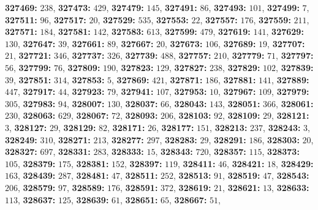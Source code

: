 \textsf{\bfseries 327469:} $238$, \textsf{\bfseries 327473:} $429$, \textsf{\bfseries 327479:} $145$, \textsf{\bfseries 327491:} $86$, \textsf{\bfseries 327493:} $101$, \textsf{\bfseries 327499:} $7$, \textsf{\bfseries 327511:} $96$, \textsf{\bfseries 327517:} $20$, \textsf{\bfseries 327529:} $535$, \textsf{\bfseries 327553:} $22$, \textsf{\bfseries 327557:} $176$, \textsf{\bfseries 327559:} $211$, \textsf{\bfseries 327571:} $184$, \textsf{\bfseries 327581:} $142$, \textsf{\bfseries 327583:} $613$, \textsf{\bfseries 327599:} $479$, \textsf{\bfseries 327619:} $141$, \textsf{\bfseries 327629:} $130$, \textsf{\bfseries 327647:} $39$, \textsf{\bfseries 327661:} $89$, \textsf{\bfseries 327667:} $20$, \textsf{\bfseries 327673:} $106$, \textsf{\bfseries 327689:} $19$, \textsf{\bfseries 327707:} $21$, \textsf{\bfseries 327721:} $346$, \textsf{\bfseries 327737:} $326$, \textsf{\bfseries 327739:} $488$, \textsf{\bfseries 327757:} $210$, \textsf{\bfseries 327779:} $71$, \textsf{\bfseries 327797:} $56$, \textsf{\bfseries 327799:} $76$, \textsf{\bfseries 327809:} $190$, \textsf{\bfseries 327823:} $129$, \textsf{\bfseries 327827:} $238$, \textsf{\bfseries 327829:} $102$, \textsf{\bfseries 327839:} $39$, \textsf{\bfseries 327851:} $314$, \textsf{\bfseries 327853:} $5$, \textsf{\bfseries 327869:} $421$, \textsf{\bfseries 327871:} $186$, \textsf{\bfseries 327881:} $141$, \textsf{\bfseries 327889:} $447$, \textsf{\bfseries 327917:} $44$, \textsf{\bfseries 327923:} $79$, \textsf{\bfseries 327941:} $107$, \textsf{\bfseries 327953:} $10$, \textsf{\bfseries 327967:} $109$, \textsf{\bfseries 327979:} $305$, \textsf{\bfseries 327983:} $94$, \textsf{\bfseries 328007:} $130$, \textsf{\bfseries 328037:} $66$, \textsf{\bfseries 328043:} $143$, \textsf{\bfseries 328051:} $366$, \textsf{\bfseries 328061:} $230$, \textsf{\bfseries 328063:} $629$, \textsf{\bfseries 328067:} $72$, \textsf{\bfseries 328093:} $206$, \textsf{\bfseries 328103:} $92$, \textsf{\bfseries 328109:} $29$, \textsf{\bfseries 328121:} $3$, \textsf{\bfseries 328127:} $29$, \textsf{\bfseries 328129:} $82$, \textsf{\bfseries 328171:} $26$, \textsf{\bfseries 328177:} $151$, \textsf{\bfseries 328213:} $237$, \textsf{\bfseries 328243:} $3$, \textsf{\bfseries 328249:} $310$, \textsf{\bfseries 328271:} $213$, \textsf{\bfseries 328277:} $297$, \textsf{\bfseries 328283:} $29$, \textsf{\bfseries 328291:} $186$, \textsf{\bfseries 328303:} $20$, \textsf{\bfseries 328327:} $697$, \textsf{\bfseries 328331:} $283$, \textsf{\bfseries 328333:} $15$, \textsf{\bfseries 328343:} $720$, \textsf{\bfseries 328357:} $115$, \textsf{\bfseries 328373:} $105$, \textsf{\bfseries 328379:} $175$, \textsf{\bfseries 328381:} $152$, \textsf{\bfseries 328397:} $119$, \textsf{\bfseries 328411:} $46$, \textsf{\bfseries 328421:} $18$, \textsf{\bfseries 328429:} $163$, \textsf{\bfseries 328439:} $287$, \textsf{\bfseries 328481:} $47$, \textsf{\bfseries 328511:} $252$, \textsf{\bfseries 328513:} $91$, \textsf{\bfseries 328519:} $47$, \textsf{\bfseries 328543:} $206$, \textsf{\bfseries 328579:} $97$, \textsf{\bfseries 328589:} $176$, \textsf{\bfseries 328591:} $372$, \textsf{\bfseries 328619:} $21$, \textsf{\bfseries 328621:} $13$, \textsf{\bfseries 328633:} $113$, \textsf{\bfseries 328637:} $125$, \textsf{\bfseries 328639:} $61$, \textsf{\bfseries 328651:} $65$, \textsf{\bfseries 328667:} $51$, 
